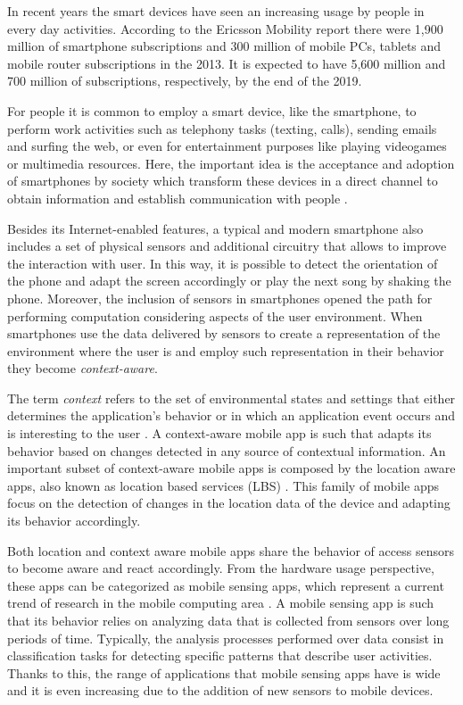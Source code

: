 In recent years the smart devices have seen an increasing usage by people in every day activities.
According to the Ericsson Mobility report \cite{Qureshi2014} there were 1,900 million of smartphone subscriptions and 300 million of mobile PCs, tablets and mobile router subscriptions in the 2013.
It is expected to have 5,600 million and 700 million of subscriptions, respectively, by the end of the 2019.


For people it is common to employ a smart device, like the smartphone, to perform work activities such as telephony tasks (texting, calls), sending emails and surfing the web, or even for entertainment purposes like playing videogames or multimedia resources. 
Here, the important idea is the acceptance and adoption of smartphones by society which transform these devices in a direct channel to obtain information and establish communication with people \cite{Perez-Torres2012a}.


Besides its Internet-enabled features, a typical and modern smartphone also includes a set of physical sensors and additional circuitry that allows to improve the interaction with user. In this way, it is possible to detect the orientation of the phone and adapt the screen accordingly or play the next song by shaking the phone.
Moreover, the inclusion of sensors in smartphones opened the path for performing computation considering aspects of the user environment. When smartphones use the data delivered by sensors to create a representation of the environment where the user is and employ such representation in their behavior they become \emph{context-aware}.


The term \emph{context} refers to the set of environmental states and settings that either determines the application’s behavior or in which an application event occurs and is interesting to the user \cite{Chen2000}.
A context-aware mobile app is such that adapts its behavior based on changes detected in any source of contextual information.
An important subset of context-aware mobile apps is composed by the location aware apps, also known as location based services (LBS) \cite{Zhuang2010,Kjaergaard2012}. 
This family of mobile apps focus on the detection of changes in the location data of the device and adapting its behavior accordingly.


Both location and context aware mobile apps share the behavior of access sensors to become aware and react accordingly.
From the hardware usage perspective, these apps can be categorized as mobile sensing apps, which represent a current trend of research in the mobile computing area \cite{Lane2010, Campbell2012}.
A mobile sensing app is such that its behavior relies on analyzing data that is collected from sensors over long periods of time.
Typically, the analysis processes performed over data consist in classification tasks for detecting specific patterns that describe user activities.
Thanks to this, the range of applications that mobile sensing apps have is wide and it is even increasing due to the addition of new sensors to mobile devices.

